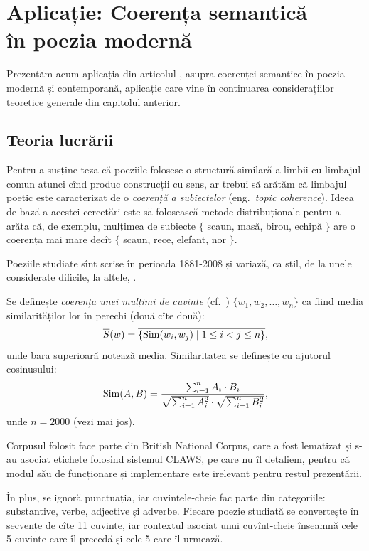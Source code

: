 
\chapter{Aplicație: Coerența semantică \\ în poezia modernă}

Prezentăm acum aplicația din articolul \cite{herbelot}, asupra coerenței
semantice în poezia modernă și contemporană, aplicație care vine în
continuarea considerațiilor teoretice generale din capitolul anterior.

\section{Teoria lucrării}

Pentru a susține teza că poeziile folosesc o structură similară a limbii
cu limbajul comun atunci cînd produc construcții cu sens, ar trebui să
arătăm că limbajul poetic este caracterizat de o \emph{coerență a subiectelor}
(eng.\ \emph{topic coherence}). Ideea de bază a acestei cercetări este să
folosească metode distribuționale pentru a arăta că, de exemplu, mulțimea de
subiecte $ \{ $ scaun, masă, birou, echipă $ \} $ are o coerența mai mare
decît $ \{ $ scaun, rece, elefant, nor $ \} $.

Poeziile studiate sînt scrise în perioada 1881-2008 și variază, ca stil,
de la unele considerate dificile, la altele, .

Se definește \emph{coerența unei mulțimi de cuvinte} (cf.\ \cite{newman})
$ \{ w_1, w_2, \dots, w_n \} $ ca fiind media similarităților lor în perechi
(două cîte două):
\[
  \overline{S}(w) = \overline{\{ \mathrm{Sim}(w_i, w_j) \mid 1 \leq i < j \leq n \} },
\]
unde bara superioară notează media. Similaritatea se definește cu ajutorul
cosinusului:
\[
  \dr{Sim}(A, B) = \dfrac{\sum_{i=1}^n A_i \cdot B_i}{\sqrt{\sum_{i=1}^n A_i^2} %
    \cdot \sqrt{\sum_{i=1}^n B_i^2}},
\]
unde $ n = 2000 $ (vezi mai jos).

Corpusul folosit face parte din British National Corpus, care a fost lematizat
și s-au asociat etichete folosind sistemul \href{http://ucrel.lancs.ac.uk/claws/}{CLAWS},
pe care nu îl detaliem, pentru că modul său de funcționare și implementare
este irelevant pentru restul prezentării.

În plus, se ignoră punctuația, iar cuvintele-cheie fac parte din categoriile:
substantive, verbe, adjective și adverbe. Fiecare poezie studiată se convertește
în secvențe de cîte 11 cuvinte, iar contextul asociat unui cuvînt-cheie înseamnă
cele 5 cuvinte care îl precedă și cele 5 care îl urmează.

